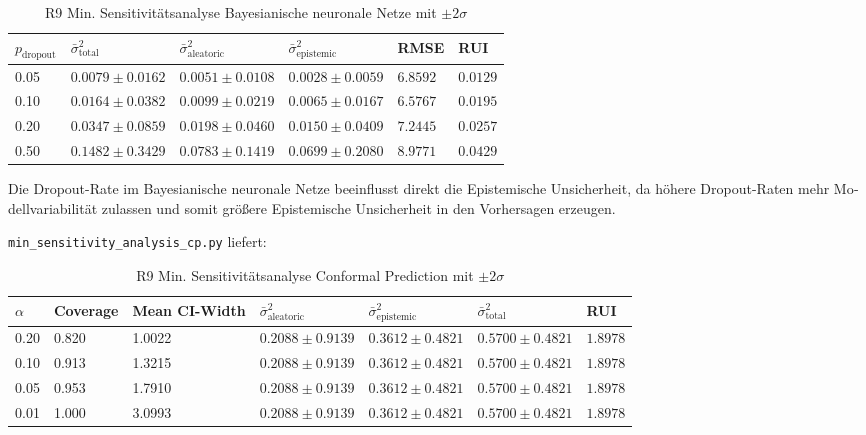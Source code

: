 \begin{otherlanguage}{ngerman}
\begin{table}[!htbp]
\centering
\footnotesize
\begin{tabularx}{\textwidth}{|X|X|X|X|X|X|}
\hline
$p_{\text{dropout}}$ 
& $\bar{\sigma}^2_{\text{total}}$
& $\bar{\sigma}^2_{\text{aleatoric}}$
& $\bar{\sigma}^2_{\text{epistemic}}$
& RMSE 
& RUI \\
\hline
0.05 & $0.0079 \pm 0.0162$ & $0.0051 \pm 0.0108$ & $0.0028 \pm 0.0059$ & $6.8592$ & $0.0129$ \\
\hline
0.10 & $0.0164 \pm 0.0382$ & $0.0099 \pm 0.0219$ & $0.0065 \pm 0.0167$ & $6.5767$ & $0.0195$ \\
\hline
0.20 & $0.0347 \pm 0.0859$ & $0.0198 \pm 0.0460$ & $0.0150 \pm 0.0409$ & $7.2445$ & $0.0257$ \\
\hline
0.50 & $0.1482 \pm 0.3429$ & $0.0783 \pm 0.1419$ & $0.0699 \pm 0.2080$ & $8.9771$ & $0.0429$ \\
\hline
\end{tabularx}
\caption{R9 Min. Sensitivitätsanalyse \gls{Bayesianische neuronale Netze} mit $\pm 2\sigma$}
\label{tab:bnn_results}
\end{table} 

Die Dropout-Rate im \gls{Bayesianische neuronale Netze} beeinflusst direkt die \gls{Epistemische Unsicherheit}, da höhere Dropout-Raten mehr Modellvariabilität zulassen und somit größere \gls{Epistemische Unsicherheit} in den Vorhersagen erzeugen.

\newline
\texttt{min\_sensitivity\_analysis\_cp.py} liefert:

\begin{table}[!htbp]
\centering
\footnotesize
\begin{tabularx}{\textwidth}{|X|X|X|X|X|X|X|}
\hline
$\alpha$ 
& Coverage 
& Mean CI-Width 
& $\bar{\sigma}^2_{\text{aleatoric}}$
& $\bar{\sigma}^2_{\text{epistemic}}$
& $\bar{\sigma}^2_{\text{total}}$
& RUI \\
\hline
0.20 & 0.820 & 1.0022 & $0.2088 \pm 0.9139$ & $0.3612 \pm 0.4821$ & $0.5700 \pm 0.4821$ & $1.8978$ \\
\hline
0.10 & 0.913 & 1.3215 & $0.2088 \pm 0.9139$ & $0.3612 \pm 0.4821$ & $0.5700 \pm 0.4821$ & $1.8978$ \\
\hline
0.05 & 0.953 & 1.7910 & $0.2088 \pm 0.9139$ & $0.3612 \pm 0.4821$ & $0.5700 \pm 0.4821$ & $1.8978$ \\
\hline
0.01 & 1.000 & 3.0993 & $0.2088 \pm 0.9139$ & $0.3612 \pm 0.4821$ & $0.5700 \pm 0.4821$ & $1.8978$ \\
\hline
\end{tabularx}
\caption{R9 Min. Sensitivitätsanalyse \gls{Conformal Prediction} mit $\pm 2\sigma$}
\label{tab:cp_results}
\end{table}


\end{otherlanguage}
